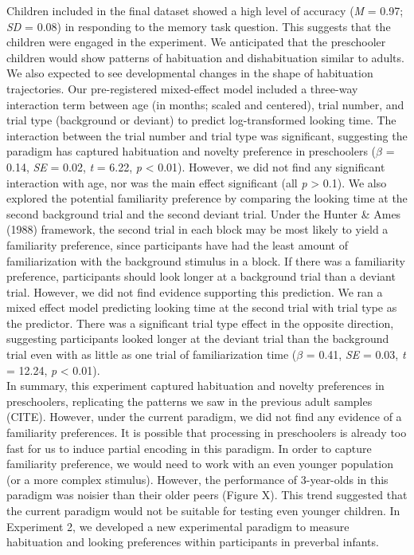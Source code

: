 \documentclass[10pt, letterpaper]{article}
\begin{document}
Children included in the final dataset showed a high level of accuracy
(\emph{M} = 0.97; \emph{SD} = 0.08) in responding to the memory task
question. This suggests that the children were engaged in the
experiment. We anticipated that the preschooler children would show
patterns of habituation and dishabituation similar to adults. We also
expected to see developmental changes in the shape of habituation
trajectories. Our pre-registered mixed-effect model included a three-way
interaction term between age (in months; scaled and centered), trial
number, and trial type (background or deviant) to predict
log-transformed looking time. The interaction between the trial number
and trial type was significant, suggesting the paradigm has captured
habituation and novelty preference in preschoolers (\(\beta\) = 0.14,
\emph{SE} = 0.02, \emph{t} = 6.22, \emph{p} \textless{} 0.01). However,
we did not find any significant interaction with age, nor was the main
effect significant (all \emph{p} \textgreater{} 0.1). We also explored
the potential familiarity preference by comparing the looking time at
the second background trial and the second deviant trial. Under the
Hunter \& Ames (1988) framework, the second trial in each block may be
most likely to yield a familiarity preference, since participants have
had the least amount of familiarization with the background stimulus in
a block. If there was a familiarity preference, participants should look
longer at a background trial than a deviant trial. However, we did not
find evidence supporting this prediction. We ran a mixed effect model
predicting looking time at the second trial with trial type as the
predictor. There was a significant trial type effect in the opposite
direction, suggesting participants looked longer at the deviant trial
than the background trial even with as little as one trial of
familiarization time (\(\beta\) = 0.41, \emph{SE} = 0.03, \emph{t} =
12.24, \emph{p} \textless{} 0.01).\\
In summary, this experiment captured habituation and novelty preferences
in preschoolers, replicating the patterns we saw in the previous adult
samples (CITE). However, under the current paradigm, we did not find any
evidence of a familiarity preferences. It is possible that processing in
preschoolers is already too fast for us to induce partial encoding in
this paradigm. In order to capture familiarity preference, we would need
to work with an even younger population (or a more complex stimulus).
However, the performance of 3-year-olds in this paradigm was noisier
than their older peers (Figure X). This trend suggested that the current
paradigm would not be suitable for testing even younger children. In
Experiment 2, we developed a new experimental paradigm to measure
habituation and looking preferences within participants in preverbal
infants.
\end{document}
